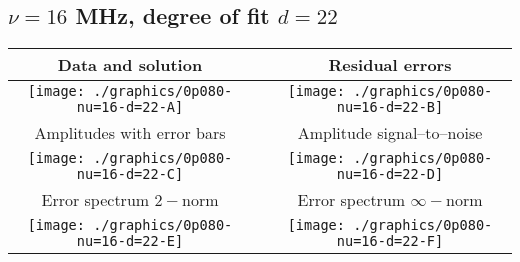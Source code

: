 

% 

\clearpage{}
\break{}

\subsection{$\nu = 16$ MHz, degree of fit $d = 22$}

\begin{table}[h]
    \begin{center}
        \begin{tabular}{ccc}
            Data and solution & \quad & Residual errors \\\hline
            \texttt{[image: ./graphics/0p080-nu=16-d=22-A]} &&
            \texttt{[image: ./graphics/0p080-nu=16-d=22-B]} \\[15pt]
            Amplitudes with error bars && Amplitude signal--to--noise \\\hline
            \texttt{[image: ./graphics/0p080-nu=16-d=22-C]} &&
            \texttt{[image: ./graphics/0p080-nu=16-d=22-D]} \\[15pt]
            Error spectrum $2-$norm && Error spectrum $\infty-$norm \\\hline
            \texttt{[image: ./graphics/0p080-nu=16-d=22-E]} &&
            \texttt{[image: ./graphics/0p080-nu=16-d=22-F]} \\[15pt]
        \end{tabular}
    \end{center}
\label{fig:elev=80, nu=16}
\end{table}



\endinput
